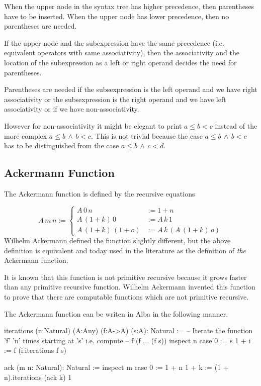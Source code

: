 When the upper node in the syntax tree has higher precedence, then parentheses
have to be inserted. When the upper node has lower precedence, then no
parentheses are needed.

If the upper node and the subexpression have the same precedence
(i.e. equivalent operators with same associativity), then the associativity
and the location of the subexpression as a left or right operand decides the
need for parentheses.

Parentheses are needed if the subsexpression is the left operand and we have
right associativity or the subsexpression is the right operand and we have
left associativity or if we have non-associativity.

However for non-associativity it might be elegant to print $a \le b < c$
instead of the more complex $a \le b \,\land\, b < c$. This is not trivial
because the case $a \le b \,\land\, b < c$ has to be distinguished from the
case $a \le b \,\land\, c < d$.





\subsection{Ackermann Function}


The Ackermann function is defined by the recursive equations

$$
A \, m \, n :=
\begin{cases}
  A\, 0\, n &:= 1 + n
  \\
  A\, (1+k)\, 0 &:= A\, k\, 1
  \\
  A\, (1+k)\, (1+o) & := A\, k\, (A\, (1+k)\, o)
\end{cases}
$$
%
Wilhelm Ackermann defined the function slightly different, but the above
definition is equivalent and today used in the literature as the definition of
\emph{the} Ackermann function.

It is known that this function is not primitive recursive because it grows
faster than any primitive recursive function. Wilhelm Ackermann invented this
function to prove that there are computable functions which are not primitive
recursive.

The Ackermann function can be writen in Alba in the following manner.

\begin{alba}
   iterations (n:Natural) (A:Any) (f:A->A) (s:A): Natural :=
       -- Iterate the function 'f' 'n' times starting at 's' i.e. compute
       -- f (f ... (f s))
     inspect
       n
     case
       0 :=
         s
       1 + i :=
         f (i.iterations f s)

   ack (m n: Natural): Natural :=
     inspect
       m
     case
       0 :=
         1 + n
       1 + k :=
         (1 + n).iterations (ack k) 1
\end{alba}

